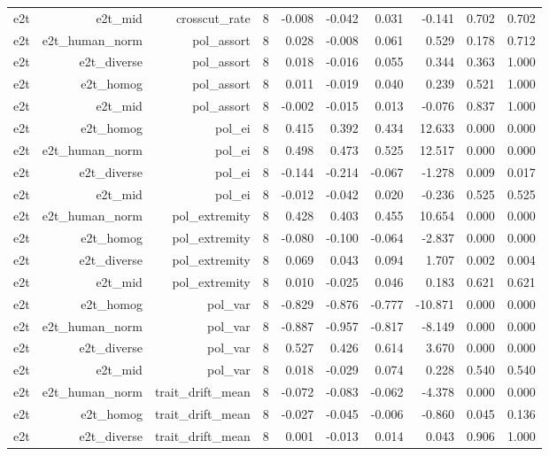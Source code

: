 \documentclass[11pt]{article}
\begin{document}
\begin{landscape}
\begin{longtable}{@{}lrrrrrrrrr@{}}
e2t & e2t\_mid & crosscut\_rate & 8 & -0.008 & -0.042 & 0.031 & -0.141 & 0.702 & 0.702 \\
e2t & e2t\_human\_norm & pol\_assort & 8 & 0.028 & -0.008 & 0.061 & 0.529 & 0.178 & 0.712 \\
e2t & e2t\_diverse & pol\_assort & 8 & 0.018 & -0.016 & 0.055 & 0.344 & 0.363 & 1.000 \\
e2t & e2t\_homog & pol\_assort & 8 & 0.011 & -0.019 & 0.040 & 0.239 & 0.521 & 1.000 \\
e2t & e2t\_mid & pol\_assort & 8 & -0.002 & -0.015 & 0.013 & -0.076 & 0.837 & 1.000 \\
e2t & e2t\_homog & pol\_ei & 8 & 0.415 & 0.392 & 0.434 & 12.633 & 0.000 & 0.000 \\
e2t & e2t\_human\_norm & pol\_ei & 8 & 0.498 & 0.473 & 0.525 & 12.517 & 0.000 & 0.000 \\
e2t & e2t\_diverse & pol\_ei & 8 & -0.144 & -0.214 & -0.067 & -1.278 & 0.009 & 0.017 \\
e2t & e2t\_mid & pol\_ei & 8 & -0.012 & -0.042 & 0.020 & -0.236 & 0.525 & 0.525 \\
e2t & e2t\_human\_norm & pol\_extremity & 8 & 0.428 & 0.403 & 0.455 & 10.654 & 0.000 & 0.000 \\
e2t & e2t\_homog & pol\_extremity & 8 & -0.080 & -0.100 & -0.064 & -2.837 & 0.000 & 0.000 \\
e2t & e2t\_diverse & pol\_extremity & 8 & 0.069 & 0.043 & 0.094 & 1.707 & 0.002 & 0.004 \\
e2t & e2t\_mid & pol\_extremity & 8 & 0.010 & -0.025 & 0.046 & 0.183 & 0.621 & 0.621 \\
e2t & e2t\_homog & pol\_var & 8 & -0.829 & -0.876 & -0.777 & -10.871 & 0.000 & 0.000 \\
e2t & e2t\_human\_norm & pol\_var & 8 & -0.887 & -0.957 & -0.817 & -8.149 & 0.000 & 0.000 \\
e2t & e2t\_diverse & pol\_var & 8 & 0.527 & 0.426 & 0.614 & 3.670 & 0.000 & 0.000 \\
e2t & e2t\_mid & pol\_var & 8 & 0.018 & -0.029 & 0.074 & 0.228 & 0.540 & 0.540 \\
e2t & e2t\_human\_norm & trait\_drift\_mean & 8 & -0.072 & -0.083 & -0.062 & -4.378 & 0.000 & 0.000 \\
e2t & e2t\_homog & trait\_drift\_mean & 8 & -0.027 & -0.045 & -0.006 & -0.860 & 0.045 & 0.136 \\
e2t & e2t\_diverse & trait\_drift\_mean & 8 & 0.001 & -0.013 & 0.014 & 0.043 & 0.906 & 1.000 \\

\end{longtable}
\end{landscape}
\end{document}
